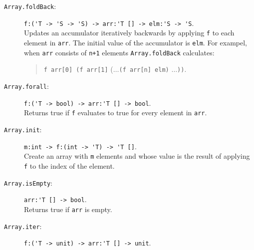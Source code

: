 \documentclass[fsharpNotes.tex]{subfiles}
\begin{document}
\begin{description}
\begin{quote}
  \end{quote}
\item[\texttt{Array.foldBack}:] \lstinline{f:('T -> 'S -> 'S) -> arr:'T [] -> elm:'S -> 'S}.~\\
  Updates an accumulator iteratively backwards by applying \lstinline{f} to each element in \lstinline{arr}. The initial value of the accumulator is \lstinline{elm}. For exampel, when \lstinline{arr} consists of \lstinline{n+1} elements
  \lstinline{Array.foldBack} calculates:
  \begin{quote}
    \lstinline{f arr[0] (f arr[1]} ($\ldots$\lstinline{(f arr[n] elm)} $\ldots$\lstinline{))}.
  \end{quote}
\item[\texttt{Array.forall}:] \lstinline{f:('T -> bool) -> arr:'T [] -> bool}.~\\
  Returns true if \lstinline{f} evaluates to true for every element in \lstinline{arr}.
\item[\texttt{Array.init}:] \lstinline{m:int -> f:(int -> 'T) -> 'T []}.~\\
  Create an array with \lstinline{m} elements and whose value is the result of applying \lstinline{f} to the index of the element.
\item[\texttt{Array.isEmpty}:] \lstinline{arr:'T [] -> bool}.~\\
  Returns true if \lstinline{arr} is empty.
\item[\texttt{Array.iter}:] \lstinline{f:('T -> unit) -> arr:'T [] -> unit}.~\\

\end{description}
\end{document}
